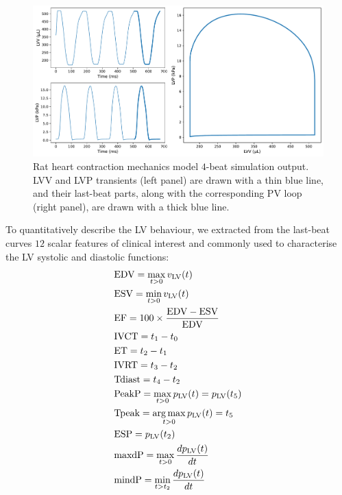 \begin{figure}[ht!]
    \myfloatalign
    \includegraphics[width=\textwidth]{figures/chapter03/a_typical_model_output.pdf}
    \caption{Rat heart contraction mechanics model $4$-beat simulation output. LVV and LVP transients (left panel) are drawn with a thin blue line, and their last-beat parts, along with the corresponding PV loop (right panel), are drawn with a thick blue line.}
    \label{fig:examplepvloop}
\end{figure}

\vspace{0.2cm}
To quantitatively describe the LV behaviour, we extracted from the last-beat curves $12$ scalar features of clinical interest and commonly used to characterise the LV systolic and diastolic functions:
%
\begin{align}
    &\text{EDV}= \max_{t>0}{v_{\textrm{LV}}(t)} \\
    &\text{ESV}= \min_{t>0}{v_{\textrm{LV}}(t)} \\
    &\text{EF}= 100\times\frac{\text{EDV}-\text{ESV}}{\text{EDV}} \\
    &\text{IVCT}= t_1-t_0 \\
    &\text{ET}= t_2-t_1 \\
    &\text{IVRT}= t_3-t_2 \\
    &\text{Tdiast}= t_4-t_2 \\
    &\text{PeakP}= \max_{t>0}{p_{\textrm{LV}}(t)} = p_{\textrm{LV}}(t_5) \\
    &\text{Tpeak}= \operatorname*{arg\,max}_{t>0}{p_{\textrm{LV}}(t)} = t_5 \\
    &\text{ESP}= p_{\textrm{LV}}(t_2) \\
    &\text{maxdP}= \max_{t>0}{\frac{dp_{\textrm{LV}}(t)}{dt}} \\
    &\text{mindP}= \min_{t>t_2}{\frac{dp_{\textrm{LV}}(t)}{dt}}
\end{align}

